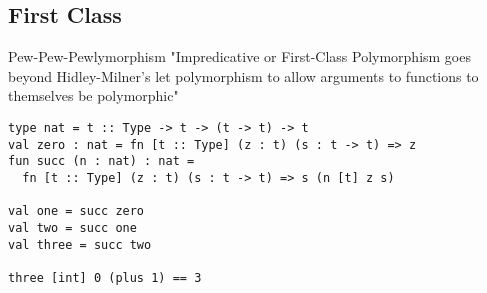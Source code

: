 \documentclass{beamer}
\begin{document}
\subsection{First Class}
\begin{frame}[fragile]{Pew-Pew-Pewlymorphism}
"Impredicative or First-Class Polymorphism goes beyond Hidley-Milner's let polymorphism to allow arguments to functions to themselves be polymorphic"
\begin{verbatim}
type nat = t :: Type -> t -> (t -> t) -> t
val zero : nat = fn [t :: Type] (z : t) (s : t -> t) => z
fun succ (n : nat) : nat = 
  fn [t :: Type] (z : t) (s : t -> t) => s (n [t] z s)

val one = succ zero
val two = succ one
val three = succ two

three [int] 0 (plus 1) == 3
\end{verbatim}
\end{frame}
\end{document}
